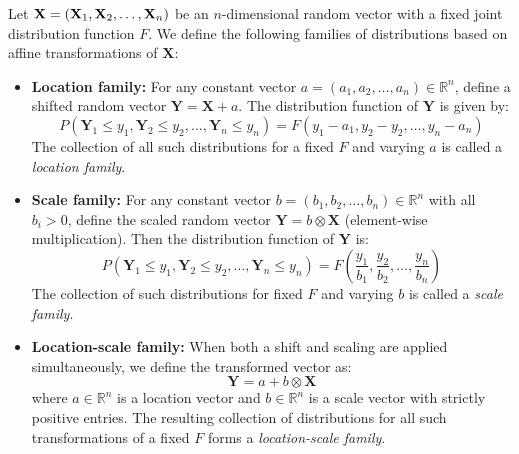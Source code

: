 \begin{definition}
	Let $\mathbf{X} = (\mathbf{X}_1, \mathbf{X}_2, \dots, \mathbf{X}_{n})$ be an $n$-dimensional random vector with a fixed joint distribution function $F$. We define the following families of distributions based on affine transformations of $\mathbf{X}$:
	
	\begin{itemize}
		\item \textbf{Location family:}  
		For any constant vector $a = (a_1, a_2, \dots, a_n) \in \mathbb{R}^n$, define a shifted random vector $\mathbf{Y} = \mathbf{X} + a$. The distribution function of $\mathbf{Y}$ is given by:
		\[
		P(\mathbf{Y}_1 \leqslant y_1, \mathbf{Y}_2 \leqslant y_2, \dots, \mathbf{Y}_n \leqslant y_n) = F(y_1 - a_1, y_2 - y_2, \dots, y_n - a_n)
		\]
		The collection of all such distributions for a fixed $F$ and varying $a$ is called a \emph{location family}.
		
		\item \textbf{Scale family:}  
		For any constant vector $b = (b_1, b_2, \dots, b_n) \in \mathbb{R}^n$ with all $b_i > 0$, define the scaled random vector $\mathbf{Y} = b \otimes \mathbf{X}$ (element-wise multiplication). Then the distribution function of $\mathbf{Y}$ is:
		\[
		P(\mathbf{Y}_1 \leqslant y_1, \mathbf{Y}_2 \leqslant y_2, \dots, \mathbf{Y}_n \leqslant y_n) = F\left(\frac{y_1}{b_1}, \frac{y_2}{b_2}, \dots, \frac{y_n}{b_n}\right)
		\]
		The collection of such distributions for fixed $F$ and varying $b$ is called a \emph{scale family}.
		
		\item \textbf{Location-scale family:}  
		When both a shift and scaling are applied simultaneously, we define the transformed vector as:
		\[
		\mathbf{Y} = a + b \otimes \mathbf{X}
		\]
		where $a \in \mathbb{R}^n$ is a location vector and $b \in \mathbb{R}^n$ is a scale vector with strictly positive entries. The resulting collection of distributions for all such transformations of a fixed $F$ forms a \emph{location-scale family}.
	\end{itemize}
\end{definition}

